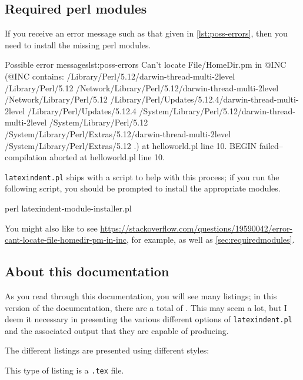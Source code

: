 \subsection{Required perl modules}
 If you receive an error message such as that given in
 \cref{lst:poss-errors}, then you need to install the missing perl modules.
 \begin{cmhlistings}[style=tcblatex,language=Perl]{Possible error messages}{lst:poss-errors}
Can't locate File/HomeDir.pm in @INC (@INC contains: /Library/Perl/5.12/darwin-thread-multi-2level /Library/Perl/5.12 /Network/Library/Perl/5.12/darwin-thread-multi-2level /Network/Library/Perl/5.12 /Library/Perl/Updates/5.12.4/darwin-thread-multi-2level /Library/Perl/Updates/5.12.4 /System/Library/Perl/5.12/darwin-thread-multi-2level /System/Library/Perl/5.12 /System/Library/Perl/Extras/5.12/darwin-thread-multi-2level /System/Library/Perl/Extras/5.12 .) at helloworld.pl line 10.
BEGIN failed--compilation aborted at helloworld.pl line 10.
\end{cmhlistings}
 \texttt{latexindent.pl} ships with a script to help with this process; if you run the
 following script, you should be prompted to install the appropriate modules.
 \begin{commandshell}
perl latexindent-module-installer.pl
\end{commandshell}
 You might also like to see
 \href{https://stackoverflow.com/questions/19590042/error-cant-locate-file-homedir-pm-in-inc}{https://stackoverflow.com/questions/19590042/error-cant-locate-file-homedir-pm-in-inc},
 for example, as well as \vref{sec:requiredmodules}.

\subsection{About this documentation}
 As you read through this documentation, you will see many listings; in this version of
 the documentation, there are a total of \totallstlistings. This may seem a lot, but I
 deem it necessary in presenting the various different options of \texttt{latexindent.pl}
 and the associated output that they are capable of producing.

 The different listings are presented using different styles:

 \begin{minipage}{.4\textwidth}
 \end{minipage}%
 \hfill
 \begin{minipage}{.4\textwidth}
  This type of listing is a \texttt{.tex} file.
 \end{minipage}%

